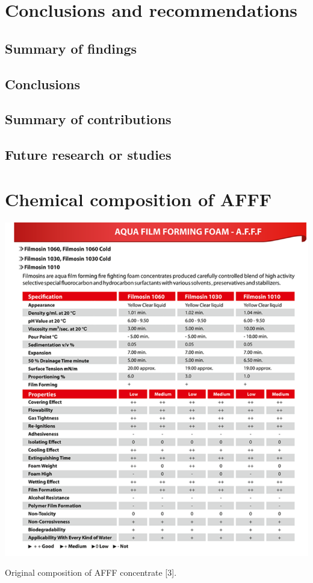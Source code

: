 \documentclass[12pt]{report}
\begin{document}
\chapter{Conclusions and recommendations}
\section{Summary of findings}
\section{Conclusions}
\section{Summary of contributions}
\section{Future research or studies}

\appendix

\chapter{Chemical composition of AFFF}
\begin{table}[H]
    \centering
    \includegraphics[width=\textwidth]{original_composition_of_afff_concentrate.png}
    \caption{Original composition of AFFF concentrate [3].}
\end{table}
\end{document}
